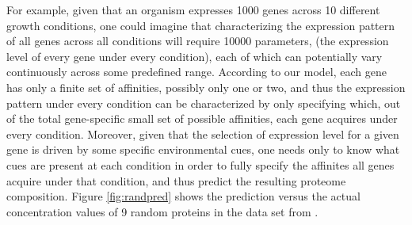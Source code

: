For example, given that an organism expresses 1000 genes across 10 different growth conditions, one could imagine that characterizing the expression pattern of all genes across all conditions will require 10000 parameters, (the expression level of every gene under every condition), each of which can potentially vary continuously across some predefined range.
According to our model, each gene has only a finite set of affinities, possibly only one or two, and thus the expression pattern under every condition can be characterized by only specifying which, out of the total gene-specific small set of possible affinities, each gene acquires under every condition.
Moreover, given that the selection of expression level for a given gene is driven by some specific environmental cues, one needs only to know what cues are present at each condition in order to fully specify the affinites all genes acquire under that condition, and thus predict the resulting proteome composition.
Figure \ref{fig:randpred} shows the prediction versus the actual concentration values of 9 random proteins in the data set from \cite{Heinemann2015}.
